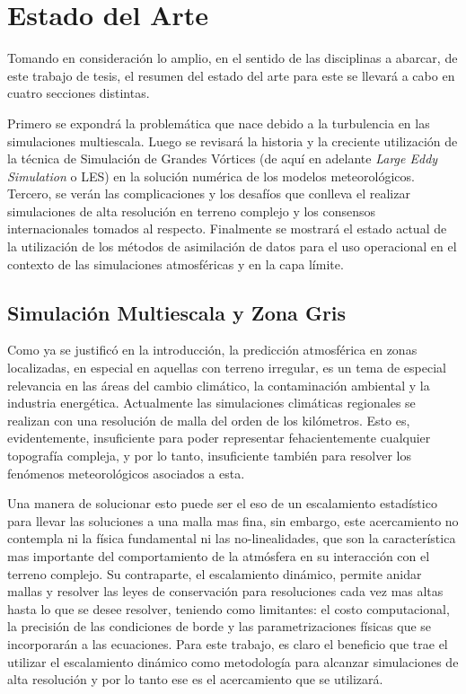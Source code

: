 \chapter{Estado del Arte}
Tomando en consideración lo amplio, en el sentido de las disciplinas a abarcar, de este trabajo de tesis, el resumen del estado del arte para este se llevará a cabo en cuatro secciones distintas. 

Primero se expondrá la problemática que nace debido a la turbulencia en las simulaciones multiescala. Luego se revisará la historia y la creciente utilización de la técnica de Simulación de Grandes Vórtices (de aquí en adelante \emph{Large Eddy Simulation} o LES) en la solución numérica de los modelos meteorológicos. Tercero, se verán las complicaciones y los desafíos que conlleva el realizar simulaciones de alta resolución en terreno complejo y los consensos internacionales tomados al respecto. Finalmente se mostrará el estado actual de la utilización de los métodos de asimilación de datos para el uso operacional en el contexto de las simulaciones atmosféricas y en la capa límite.
\section{Simulación Multiescala y Zona Gris}
Como ya se justificó en la introducción, la predicción atmosférica en zonas localizadas, en especial en aquellas con terreno irregular, es un tema de especial relevancia en las áreas del cambio climático, la contaminación ambiental y la industria energética. Actualmente las simulaciones climáticas regionales se realizan con una resolución de malla del orden de los kilómetros. Esto es, evidentemente, insuficiente para poder representar fehacientemente cualquier topografía compleja, y por lo tanto, insuficiente también para resolver los fenómenos meteorológicos asociados a esta.

Una manera de solucionar esto puede ser el eso de un escalamiento estadístico para llevar las soluciones a una malla mas fina, sin embargo, este acercamiento no contempla ni la física fundamental ni las no-linealidades, que son la característica mas importante del comportamiento de la atmósfera en su interacción con el terreno complejo. Su contraparte, el escalamiento dinámico, permite anidar mallas y resolver las leyes de conservación para resoluciones cada vez mas altas hasta lo que se desee resolver, teniendo como limitantes: el costo computacional, la precisión de las condiciones de borde y las parametrizaciones físicas que se incorporarán a las ecuaciones. Para este trabajo, es claro el beneficio que trae el utilizar el escalamiento dinámico como metodología para alcanzar simulaciones de alta resolución y por lo tanto ese es el acercamiento que se utilizará.

